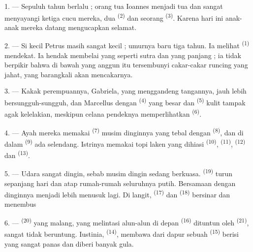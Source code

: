 \VUsaut{5.0mm}
\VUsaut{1.6mm}
\VUsaut{2.6mm}

\VUsaut{3.0mm}

1. --- Sepuluh tahun berlalu ; orang tua Ioannes menjadi tua dan
sangat menyayangi ketiga cucu mereka, dua 
\textsuperscript{(2)} dan seorang 
\textsuperscript{(3)}. Karena hari ini 
anak-anak mereka datang mengucapkan selamat.

2. --- Si kecil Petrus masih sangat kecil ; umurnya baru tiga tahun.
Ia melihat  \textsuperscript{(1)} mendekat. Ia hendak
membelai  yang seperti sutra dan 
yang panjang ; ia tidak berpikir bahwa di bawah  yang
anggun itu tersembunyi cakar-cakar runcing yang jahat, yang barangkali
akan mencakarnya.

3. --- Kakak perempuannya, Gabriela, yang menggandeng tangannya, jauh
lebih bersungguh-sungguh, dan Marcellus dengan 
\textsuperscript{(4)} yang besar dan 
\textsuperscript{(5)} kulit tampak agak kelelakian, meskipun celana
pendeknya memperlihatkan  \textsuperscript{(6)}.

4. --- Ayah mereka memakai  \textsuperscript{(7)}
musim dinginnya yang tebal dengan 
\textsuperscript{(8)}, dan di dalam 
\textsuperscript{(9)} ada selendang. Istrinya memakai topi laken yang
dihiasi  \textsuperscript{(10)}, 
\textsuperscript{(11)}, 
\textsuperscript{(12)} dan 
\textsuperscript{(13)}.

5. --- Udara sangat dingin, sebab musim dingin sedang berkuasa.
 \textsuperscript{(19)} turun sepanjang hari dan atap
rumah-rumah seluruhnya putih. Bersamaan dengan 
dinginnya menjadi lebih menusuk lagi. Di langit, 
\textsuperscript{(17)} dan 
\textsuperscript{(18)} bersinar dan menembus 

\VUsaut{4.2mm}
\VUsaut{3.0mm}

6. ---  \textsuperscript{(20)} yang malang, yang
melintasi alun-alun di depan  \textsuperscript{(16)}
dituntun oleh  \textsuperscript{(21)}, sangat
tidak beruntung. Iustinia, 
\textsuperscript{(14)}, membawa dari dapur sebuah 
\textsuperscript{(15)} berisi  yang sangat
panas dan diberi banyak gula.

